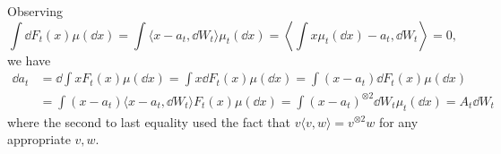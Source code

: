 Observing 
\[\int \dd F_t(x) \mu(\dd x) = \int \langle x - a_t, \dd W_t\rangle \mu_t(\dd x) = 
  \left\langle\int x \mu_t(\dd x) - a_t, \dd W_t\right\rangle = 0,\]
we have
\begin{equation}\label{eq:diff_center}
  \begin{split}
    \dd a_t & = \dd \int x F_t(x) \mu(\dd x) = \int x \dd F_t(x) \mu(\dd x) 
        = \int (x - a_t) \dd F_t(x) \mu(\dd x)\\
      & = \int (x - a_t) \langle x - a_t, \dd W_t \rangle F_t(x) \mu(\dd x) 
        = \int (x - a_t)^{\otimes 2} \dd W_t \mu_t(\dd x) = A_t \dd W_t
  \end{split}
\end{equation}
where the second to last equality used the fact that \(v \langle v, w \rangle = v^{\otimes 2} w\) for 
any appropriate \(v, w\).

